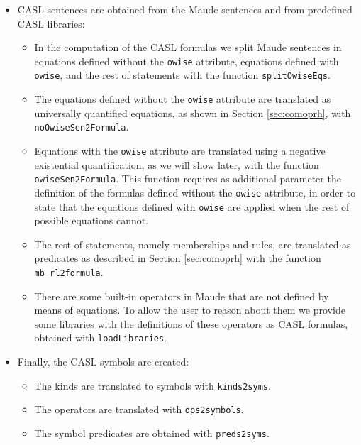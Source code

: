 \begin{itemize}
\item CASL sentences are obtained from the Maude sentences and from
predefined CASL libraries:

\begin{itemize}
\item In the computation of the CASL formulas we split Maude sentences in
equations defined without the \verb"owise" attribute, equations defined
with \verb"owise", and the rest of statements with the function
\verb"splitOwiseEqs".
\item The equations defined without the \verb"owise" attribute are
translated as universally quantified equations, as shown in Section
\ref{sec:comoprh}, with \verb"noOwiseSen2Formula".
\item Equations with the \verb"owise" attribute are translated using
a negative existential quantification, as we will show later, with
the function \verb"owiseSen2Formula". This function requires as additional
parameter the definition of the formulas defined without the \verb"owise"
attribute, in order to state that the equations defined with \verb"owise"
are applied when the rest of possible equations cannot.
\item The rest of statements, namely memberships and rules, are translated
as predicates as described in Section \ref{sec:comoprh} with the function
\verb"mb_rl2formula".
\item There are some built-in operators in Maude that are not defined by
means of equations. To allow the user to reason about them we provide
some libraries with the definitions of these operators as CASL formulas,
obtained with \verb"loadLibraries".
\end{itemize}

\item Finally, the CASL symbols are created:

\begin{itemize}
\item The kinds are translated to symbols with \verb"kinds2syms".
\item The operators are translated with \verb"ops2symbols".
\item The symbol predicates are obtained with \verb"preds2syms".
\end{itemize}

\end{itemize}

